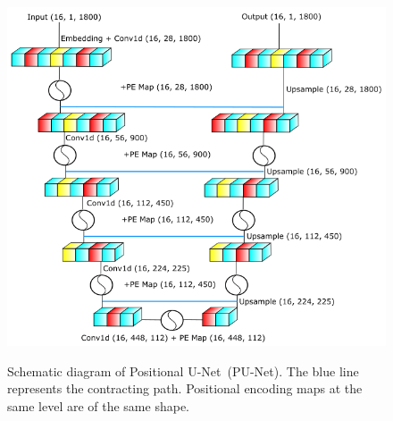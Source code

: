 
\begin{figure}[htb!]
\centering
    \includegraphics[width=0.7\linewidth]{ch5/figs/unet.png}
    \label{fig:cpunet}
    \caption{Schematic diagram of Positional U-Net~(PU-Net). The blue line represents the contracting path. Positional encoding maps at the same level are of the same shape. }
   \label{fig:network_schematic}
\end{figure}



